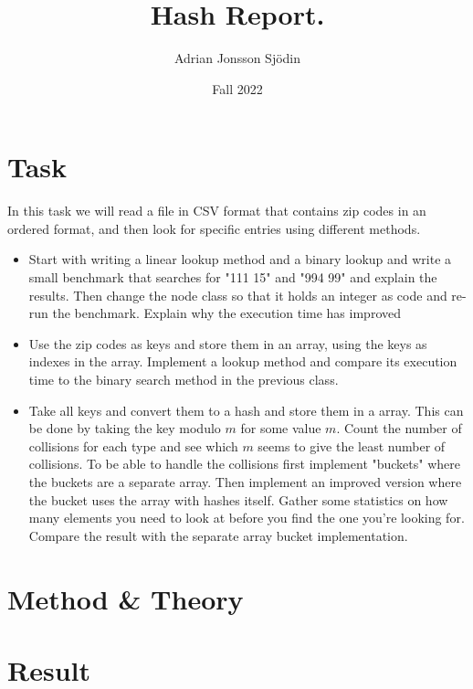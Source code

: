 \documentclass[a4paper,11pt]{article}
\begin{document}
\title{
    \textbf{Hash Report.}
}
\author{Adrian Jonsson Sjödin}
\date{Fall 2022}

\maketitle

\section{Task}
\label{task}
In this task we will read a file in CSV format that contains zip codes in an ordered format,  and then look for specific entries 
using different methods.  
\begin{itemize}
    \item Start with writing a linear lookup method and a binary lookup and write a small benchmark that searches for "111 15" 
    and "994 99" and explain the results. Then change the node class so that it holds an integer as code and re-run the benchmark. 
    Explain why the execution time has improved
    
    \item Use the zip codes as keys and store them in an array, using the keys as indexes in the array. Implement a lookup method and 
    compare its execution time to the binary search method in the previous class.

    \item Take all keys and convert them to a hash and store them in a array. This can be done by taking the key modulo $m$ for some 
    value $m$. Count the number of collisions for each type and see which $m$ seems to give the least number of collisions. To be able to
    handle the collisions first implement "buckets" where the buckets are a separate array. Then implement an improved version where the 
    bucket uses the array with hashes itself. Gather some statistics on how many elements you need to look at before you find the one you're 
    looking for. Compare the result with the separate array bucket implementation. 

\end{itemize}

\section{Method \& Theory}
\label{method}


\section{Result}
\end{document}
